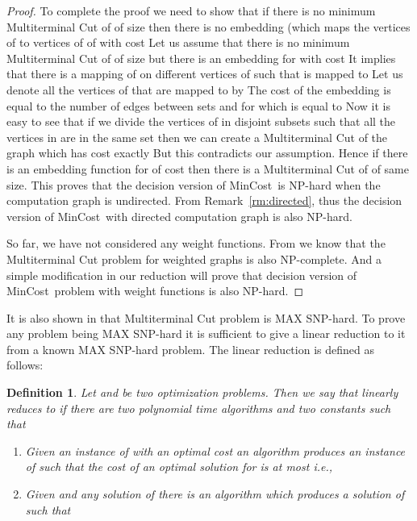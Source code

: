 \documentclass[journal]{IEEEtran}
\newtheorem{definition}{{\bf Definition}}
\newcommand{\mincost}{\textsf{MinCost}}
\begin{document}
\begin{proof}
  To complete the proof we need to show that if there is no minimum
  Multiterminal Cut of  of size  then there is no embedding
  (which maps the vertices of  to vertices of  of
   with cost  Let us assume that there is no minimum
  Multiterminal Cut of  of size  but there is an embedding
  for  with cost  It implies that there is a mapping of
   on  different vertices of  such that
   is mapped to  Let us denote all the vertices of
   that are mapped to  by  The cost of
  the embedding is equal to the number of edges between sets
   and  for  which is equal to
   Now it is easy to see that if we divide the vertices of
   in  disjoint subsets such that all the vertices
  in  are in the same set then we can create a
  Multiterminal Cut of the graph  which has cost
  exactly  But this contradicts our assumption. Hence if there is
  an embedding function  for  of cost  then there
  is a Multiterminal Cut of  of same size. This proves that the
  decision version of \mincost\ is NP-hard when the computation graph
  is undirected. From Remark~\ref{rm:directed}, thus the decision
  version of \mincost\ with directed computation graph is also
  NP-hard.

  So far, we have not considered any weight functions. From
  \cite{Dahlhaus94} we know that the Multiterminal Cut problem for
  weighted graphs is also NP-complete. And a simple modification in
  our reduction will prove that decision version of \mincost\ problem
  with weight functions is also NP-hard.
\end{proof}

It is also shown in \cite{Dahlhaus94} that Multiterminal Cut problem
is MAX SNP-hard. To prove any problem being MAX SNP-hard it is
sufficient to give a linear reduction to it from a known MAX SNP-hard
problem. The linear reduction is defined as follows:

\begin{definition}
  Let  and  be two optimization problems. Then we
  say that  linearly reduces to  if there are two
  polynomial time algorithms  and two constants  such that
\begin{enumerate}
  \item Given an instance  of  with an optimal cost
     an algorithm  produces an instance
     of  such that the cost of an
    optimal solution for 
    is at most  i.e., 
  \item Given  and any solution  of
     there is an algorithm  which produces a solution
     of  such that 
  \end{enumerate}
\end{definition}
\end{document}
